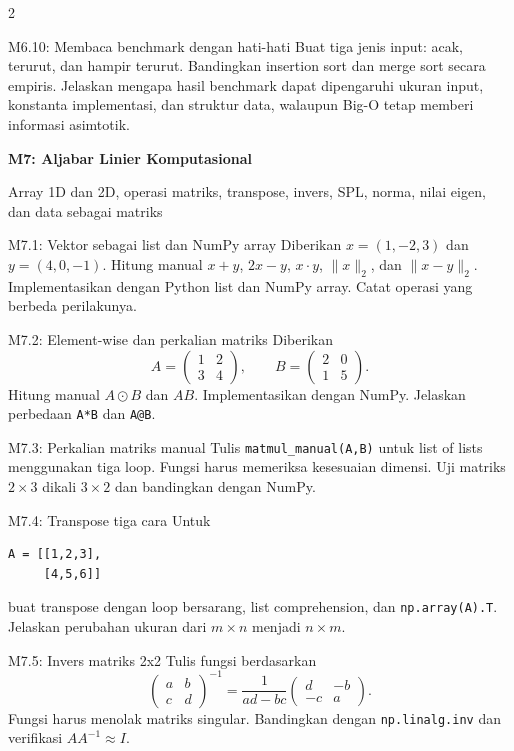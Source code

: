 \documentclass[9pt,a4paper]{article}
\newcommand{\bab}[2]{%
  \vspace{2pt}
  {\color{iteraBlue}\Large\bfseries #1}\par
  {\color{darkgray}\small #2}\par\vspace{3pt}
}
\begin{document}
\begin{multicols}{2}
\begin{qbox}[L4]{M6.10: Membaca benchmark dengan hati-hati}
Buat tiga jenis input: acak, terurut, dan hampir terurut. Bandingkan insertion sort dan merge sort secara empiris. Jelaskan mengapa hasil benchmark dapat dipengaruhi ukuran input, konstanta implementasi, dan struktur data, walaupun Big-O tetap memberi informasi asimtotik.
\end{qbox}

\bab{M7: Aljabar Linier Komputasional}{Array 1D dan 2D, operasi matriks, transpose, invers, SPL, norma, nilai eigen, dan data sebagai matriks}

\begin{qbox}[L1]{M7.1: Vektor sebagai list dan NumPy array}
Diberikan $x=(1,-2,3)$ dan $y=(4,0,-1)$. Hitung manual $x+y$, $2x-y$, $x\cdot y$, $\|x\|_2$, dan $\|x-y\|_2$. Implementasikan dengan Python list dan NumPy array. Catat operasi yang berbeda perilakunya.
\end{qbox}

\begin{qbox}[L2]{M7.2: Element-wise dan perkalian matriks}
Diberikan
\[
A=\begin{pmatrix}1&2\\3&4\end{pmatrix},\qquad
B=\begin{pmatrix}2&0\\1&5\end{pmatrix}.
\]
Hitung manual $A\odot B$ dan $AB$. Implementasikan dengan NumPy. Jelaskan perbedaan \texttt{A*B} dan \texttt{A@B}.
\end{qbox}

\begin{qbox}[L2]{M7.3: Perkalian matriks manual}
Tulis \texttt{matmul\_manual(A,B)} untuk list of lists menggunakan tiga loop. Fungsi harus memeriksa kesesuaian dimensi. Uji matriks $2\times3$ dikali $3\times2$ dan bandingkan dengan NumPy.
\end{qbox}

\begin{qbox}[L2]{M7.4: Transpose tiga cara}
Untuk
\begin{lstlisting}
A = [[1,2,3],
     [4,5,6]]
\end{lstlisting}
buat transpose dengan loop bersarang, list comprehension, dan \texttt{np.array(A).T}. Jelaskan perubahan ukuran dari $m\times n$ menjadi $n\times m$.
\end{qbox}

\begin{qbox}[L3]{M7.5: Invers matriks 2x2}
Tulis fungsi berdasarkan
\[
\begin{pmatrix}a&b\\c&d\end{pmatrix}^{-1}
=\frac{1}{ad-bc}\begin{pmatrix}d&-b\\-c&a\end{pmatrix}.
\]
Fungsi harus menolak matriks singular. Bandingkan dengan \texttt{np.linalg.inv} dan verifikasi $AA^{-1}\approx I$.
\end{qbox}


\end{multicols}
\end{document}
